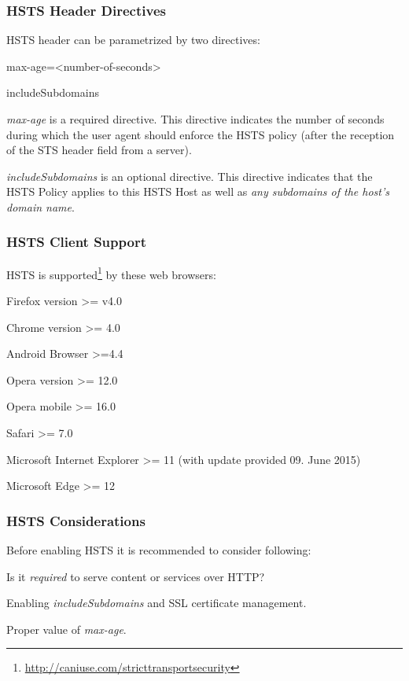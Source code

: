 \subsubsection{HSTS Header Directives}
\label{subsubsection:HSTS Header Directives}
HSTS header can be parametrized by two directives:
\begin{itemize*}
  \item max-age=<number-of-seconds> 
	\item includeSubdomains 
\end{itemize*}

\emph{max-age} is a required directive. This directive indicates the number of seconds during which the user agent should enforce the HSTS policy (after the reception of the STS header field from a server).

\emph{includeSubdomains} is an optional directive. This directive indicates that the HSTS Policy applies to this HSTS Host as well as \emph{any subdomains of the host's domain name}.

\subsubsection{HSTS Client Support}
\label{subsubsection:HSTS Client Support}
HSTS is supported\footnote{\url{http://caniuse.com/stricttransportsecurity}} by these web browsers:
\begin{itemize*}
  \item Firefox version >= v4.0
	\item Chrome version >= 4.0
	\item Android Browser >=4.4
	\item Opera version >= 12.0 
	\item Opera mobile >= 16.0
	\item Safari >= 7.0
	\item Microsoft Internet Explorer >= 11 (with update provided 09. June 2015)
	\item Microsoft Edge >= 12
\end{itemize*}

\subsubsection{HSTS Considerations}
\label{subsubsection:HSTS Considerations}
Before enabling HSTS it is recommended to consider following:
\begin{itemize*}
  \item Is it \emph{required} to serve content or services over HTTP?
	\item Enabling \emph{includeSubdomains} and SSL certificate management.
	\item Proper value of \emph{max-age}. 
\end{itemize*}

